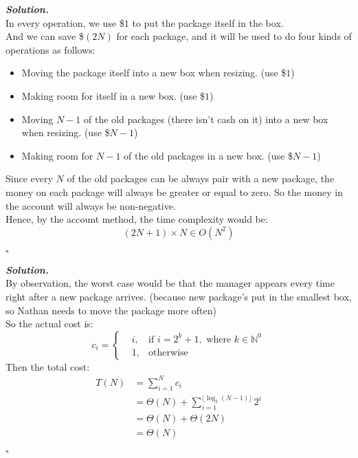 \documentclass[12pt, a4paper, UTF8]{article}
\newenvironment{solution}[1][\it{Solution}]{\textbf{#1. }\\}{\begin{flushright}$\square$\end{flushright}}
\begin{document}
\begin{subprobs}
\begin{solution}
        In every operation, we use \$$1$ to put the package itself in the box.\\
        And we can save \$$(2N)$ for each package, and it will be used to do four kinds of operations as follows:
        \begin{itemize}
            \item Moving the package itself into a new box when resizing. (use \$$1$)
            \item Making room for itself in a new box. (use \$$1$)
            \item Moving $N - 1$ of the old packages (there isn't cash on it) into a new box when resizing. (use \$$N - 1$)
            \item Making room for $N - 1$ of the old packages in a new box. (use \$$N - 1$)
        \end{itemize}
        Since every $N$ of the old packages can be always pair with a new package, the money on each package will always be greater or equal to zero. So the money in the account will always be non-negative.\\
        Hence, by the account method, the time complexity would be:
        $$(2N + 1) \times N \in O(N^2)$$ 
         
    \end{solution}
\item
    \begin{solution}
        By observation, the worst case would be that the manager appears every time right after a new package arrives. (because new package's put in the smallest box, so Nathan needs to move the package more often)\\
        So the actual cost is:
        $$c_i = \left\{\begin{aligned}
                &i, &\text{if }i = 2^k + 1,\text{ where }k \in \mathbb{N}^0\\
                &1, &\text{otherwise}
        \end{aligned}\right.$$
        Then the total cost:
        $$\begin{aligned}
            T(N) &= \sum^N_{i = 1} c_i\\ 
                 &= \Theta(N) + \sum^{\lfloor\log_{2}{(N - 1)}\rfloor}_{i = 1} 2^i\\
                 &= \Theta(N) + \Theta(2N)\\
                 &= \Theta(N)
        \end{aligned}$$
    \end{solution}

\end{subprobs}
\end{document}
